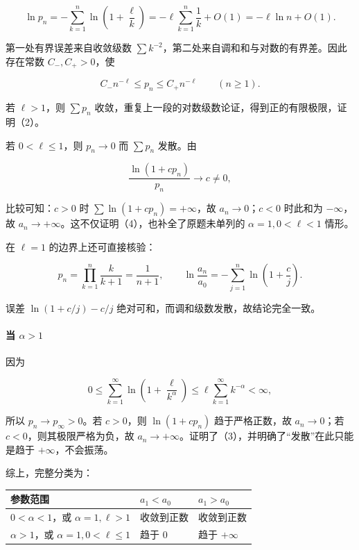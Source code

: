\documentclass[11pt,a4paper]{article}
\begin{document}
\[
\ln p_n=-\sum_{k=1}^{n}\ln\left(1+\frac\ell k\right)
=-\ell\sum_{k=1}^{n}\frac1k+O(1)
=-\ell\ln n+O(1).
\]

第一处有界误差来自收敛级数
\(\sum k^{-2}\)，第二处来自调和和与对数的有界差。因此存在常数
\(C_-,C_+>0\)，使

\[
C_-n^{-\ell}\le p_n\le C_+n^{-\ell}\qquad(n\ge1).
\]

若 \(\ell>1\)，则 \(\sum p_n\)
收敛，重复上一段的对数级数论证，得到正的有限极限，证明（2）。

若 \(0<\ell\le1\)，则 \(p_n\to0\) 而 \(\sum p_n\) 发散。由

\[
\frac{\ln(1+cp_n)}{p_n}\longrightarrow c\ne0,
\]

比较可知：\(c>0\) 时 \(\sum\ln(1+cp_n)=+\infty\)，故
\(a_n\to0\)；\(c<0\) 时此和为 \(-\infty\)，故
\(a_n\to+\infty\)。这不仅证明（4），也补全了原题未单列的
\(\alpha=1,0<\ell<1\) 情形。

在 \(\ell=1\) 的边界上还可直接核验：

\[
p_n=\prod_{k=1}^{n}\frac{k}{k+1}=\frac1{n+1},\qquad
\ln\frac{a_n}{a_0}=-\sum_{j=1}^{n}\ln\left(1+\frac cj\right).
\]

误差 \(\ln(1+c/j)-c/j\) 绝对可和，而调和级数发散，故结论完全一致。

\paragraph{\texorpdfstring{当
\(\alpha>1\)}{当 \textbackslash alpha\textgreater1}}\label{ux5f53-alpha1-1}

因为

\[
0\le\sum_{k=1}^{\infty}\ln\left(1+\frac\ell{k^\alpha}\right)
\le\ell\sum_{k=1}^{\infty}k^{-\alpha}<\infty,
\]

所以 \(p_n\to p_\infty>0\)。若 \(c>0\)，则 \(\ln(1+cp_n)\)
趋于严格正数，故 \(a_n\to0\)；若 \(c<0\)，则其极限严格为负，故
\(a_n\to+\infty\)。证明了（3），并明确了``发散''在此只能是趋于
\(+\infty\)，不会振荡。

综上，完整分类为：

\begin{longtable}[]{@{}lll@{}}
\toprule\noalign{}
参数范围 & \(a_1<a_0\) & \(a_1>a_0\) \\
\midrule\noalign{}
\endhead
\bottomrule\noalign{}
\endlastfoot
\(0<\alpha<1\)，或 \(\alpha=1,\ell>1\) & 收敛到正数 & 收敛到正数 \\
\(\alpha>1\)，或 \(\alpha=1,0<\ell\le1\) & 趋于 \(0\) & 趋于
\(+\infty\) \\
\end{longtable}
\end{document}
